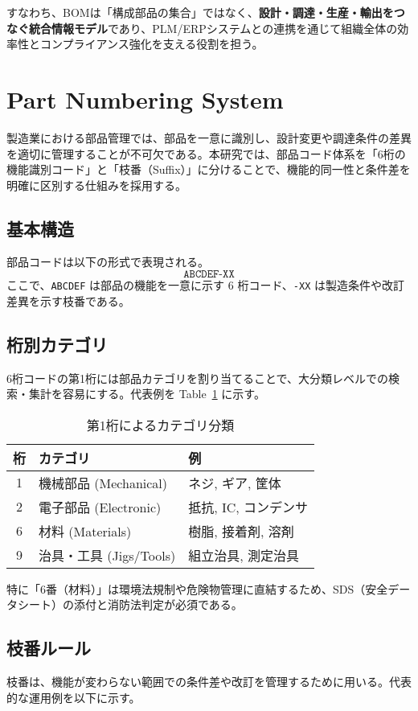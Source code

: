 \documentclass[10pt,conference]{IEEEtran}
\begin{document}
すなわち、BOMは「構成部品の集合」ではなく、\textbf{設計・調達・生産・輸出をつなぐ統合情報モデル}であり、PLM/ERPシステムとの連携を通じて組織全体の効率性とコンプライアンス強化を支える役割を担う。

\section{Part Numbering System}
製造業における部品管理では、部品を一意に識別し、設計変更や調達条件の差異を適切に管理することが不可欠である。本研究では、部品コード体系を「6桁の機能識別コード」と「枝番（Suffix）」に分けることで、機能的同一性と条件差を明確に区別する仕組みを採用する。

\subsection{基本構造}
部品コードは以下の形式で表現される。
\[
\texttt{ABCDEF-XX}
\]
ここで、\texttt{ABCDEF} は部品の機能を一意に示す 6 桁コード、\texttt{-XX} は製造条件や改訂差異を示す枝番である。

\subsection{桁別カテゴリ}
6桁コードの第1桁には部品カテゴリを割り当てることで、大分類レベルでの検索・集計を容易にする。代表例を Table~\ref{tab:categories} に示す。

\begin{table}[h]
  \centering
  \caption{第1桁によるカテゴリ分類}
  \label{tab:categories}
  \begin{tabular}{cll}
    \hline
    桁 & カテゴリ & 例 \\
    \hline
    1 & 機械部品 (Mechanical) & ネジ, ギア, 筐体 \\
    2 & 電子部品 (Electronic) & 抵抗, IC, コンデンサ \\
    6 & 材料 (Materials) & 樹脂, 接着剤, 溶剤 \\
    9 & 治具・工具 (Jigs/Tools) & 組立治具, 測定治具 \\
    \hline
  \end{tabular}
\end{table}

特に「6番（材料）」は環境法規制や危険物管理に直結するため、SDS（安全データシート）の添付と消防法判定が必須である。

\subsection{枝番ルール}
枝番は、機能が変わらない範囲での条件差や改訂を管理するために用いる。代表的な運用例を以下に示す。
\end{document}

